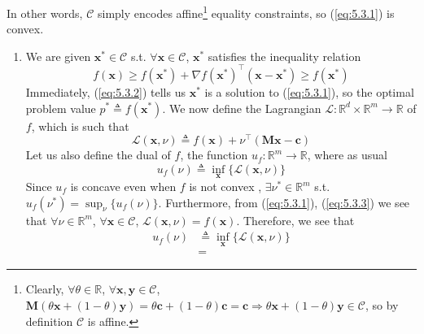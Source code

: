 \documentclass{article}
\numberwithin{equation}{section}
\begin{document}
In other words, $ \mathcal{C} $ simply encodes affine\footnote{
    Clearly, $ \forall \theta \in \mathbb{R} $, $ \forall \mathbf{x},
    \mathbf{y} \in \mathcal{C} $, $ \mathbf{M}(\theta\mathbf{x} +
    (1 - \theta)\mathbf{y}) = \theta\mathbf{c} + (1 - \theta)\mathbf{c} =
    \mathbf{c} \Rightarrow \theta\mathbf{x} + (1 - \theta)\mathbf{y} \in
    \mathcal{C} $, so by definition $ \mathcal{C} $ is affine.
} equality constraints, so (\ref{eq:5.3.1}) is convex.
\begin{enumerate}[label=\alph*.]
    \item
    We are given $ \mathbf{x}^* \in \mathcal{C} $ s.t.
    $ \forall \mathbf{x} \in \mathcal{C} $, $ \mathbf{x}^* $ satisfies the
    inequality relation
    \begin{equation} \label{eq:5.3.2}
        f(\mathbf{x}) \ge
        f(\mathbf{x}^*) +
        \nabla f(\mathbf{x}^*)^\top(\mathbf{x} - \mathbf{x}^*) \ge
        f(\mathbf{x}^*)
    \end{equation}
    Immediately, (\ref{eq:5.3.2}) tells us $ \mathbf{x}^* $ is a solution to
    (\ref{eq:5.3.1}), so the optimal problem value
    $ p^* \triangleq f(\mathbf{x}^*) $. We now define the Lagrangian
    $ \mathcal{L} : \mathbb{R}^d \times \mathbb{R}^m \rightarrow \mathbb{R} $
    of $ f $, which is such that
    \begin{equation} \label{eq:5.3.3}
        \mathcal{L}(\mathbf{x}, \nu) \triangleq
        f(\mathbf{x}) + \nu^\top(\mathbf{Mx} - \mathbf{c})
    \end{equation}
    Let us also define the dual of $ f $, the function
    $ u_f : \mathbb{R}^m \rightarrow \mathbb{R} $, where as usual
    \begin{equation} \label{eq:5.3.4}
        u_f(\nu) \triangleq
        \inf_\mathbf{x}\{\mathcal{L}(\mathbf{x}, \nu)\}
    \end{equation}
    Since $ u_f $ is concave even when $ f $ is not convex
    \cite{bv_convex_opt}, $ \exists \nu^* \in \mathbb{R}^m $ s.t.
    $ u_f(\nu^*) = \sup_\nu\{u_f(\nu)\} $. Furthermore, from (\ref{eq:5.3.1}),
    (\ref{eq:5.3.3}) we see that $ \forall \nu \in \mathbb{R}^m $,
    $ \forall \mathbf{x} \in \mathcal{C} $,
    $ \mathcal{L}(\mathbf{x}, \nu) = f(\mathbf{x}) $. Therefore, we see that
    \begin{equation} \label{eq:5.3.5}
        \begin{split}
            u_f(\nu) & \triangleq
            \inf_\mathbf{x}\{\mathcal{L}(\mathbf{x}, \nu)\} \\
            & =

\end{split}
\end{equation}
\end{enumerate}
\end{document}
